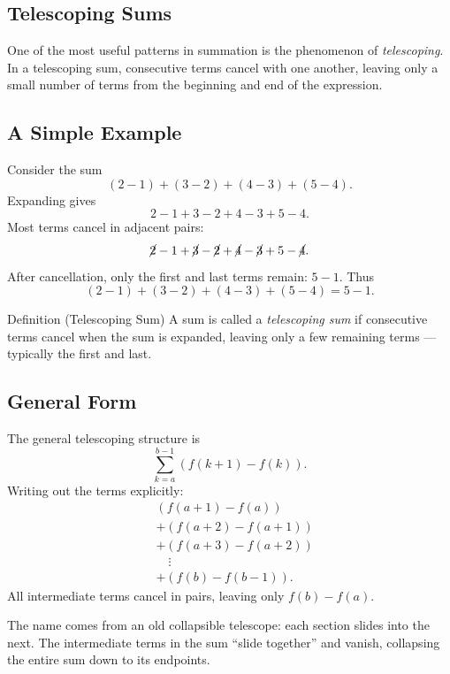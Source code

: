 
\subsection{Telescoping Sums}
\label{sec:telescoping-sums}

One of the most useful patterns in summation is the phenomenon of
\emph{telescoping}. In a telescoping sum, consecutive terms cancel with
one another, leaving only a small number of terms from the beginning
and end of the expression.

\subsection*{A Simple Example}

Consider the sum
\[
(2-1) + (3-2) + (4-3) + (5-4).
\]
Expanding gives
\[
2 - 1 + 3 - 2 + 4 - 3 + 5 - 4.
\]
Most terms cancel in adjacent pairs:
\[
\cancel{2} - 1 + \cancel{3} - \cancel{2} + \cancel{4} - \cancel{3} + 5 - \cancel{4}.
\]
After cancellation, only the first and last terms remain: \(5 - 1\).
Thus
\[
(2-1) + (3-2) + (4-3) + (5-4) = 5 - 1.
\]

\begin{definitionbox}{Definition (Telescoping Sum)}
A sum is called a \emph{telescoping sum} if consecutive terms cancel when
the sum is expanded, leaving only a few remaining terms --- typically
the first and last.
\end{definitionbox}
\label{def:telescoping-sum}

\subsection*{General Form}

The general telescoping structure is
\[
\sum_{k=a}^{b-1} (f(k+1) - f(k)).
\]
Writing out the terms explicitly:
\[
\begin{aligned}
& (f(a+1)-f(a)) \\
& + (f(a+2)-f(a+1)) \\
& + (f(a+3)-f(a+2)) \\
& \quad \vdots \\
& + (f(b)-f(b-1)).
\end{aligned}
\]
All intermediate terms cancel in pairs, leaving only \(f(b) - f(a)\).

\begin{remark*}
The name comes from an old collapsible telescope: each section slides
into the next. The intermediate terms in the sum ``slide together''
and vanish, collapsing the entire sum down to its endpoints.
\end{remark*}
